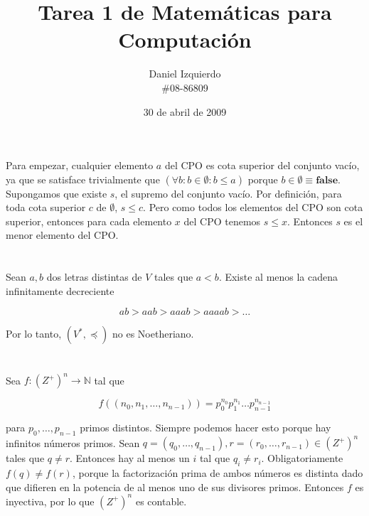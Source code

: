 \documentclass{article}
\begin{document}

\title{Tarea 1 de Matemáticas para Computación}
\author{Daniel Izquierdo \\ \#08-86809}
\date{30 de abril de 2009}

\maketitle

\section{}

Para empezar, cualquier elemento $a$ del CPO es cota superior del conjunto
vacío, ya que se satisface trivialmente que
$(\forall b : b \in \emptyset : b \leq a)$
porque $b \in \emptyset \equiv \mathbf{false}$.
Supongamos que existe $s$, el supremo del conjunto vacío. Por definición,
para toda cota superior $c$ de $\emptyset$, $s \leq c$. Pero como todos los
elementos del CPO son cota superior, entonces para cada elemento $x$ del CPO
tenemos
$s \leq x$. Entonces $s$ es el menor elemento del CPO.

\section{}

Sean $a, b$ dos letras distintas de $V$ tales que $a < b$. Existe al menos la
cadena infinitamente decreciente

$$
ab > aab > aaab > aaaab > \ldots
$$

Por lo tanto, $(V^*,\preceq)$ no es Noetheriano.

\section{}

Sea $f : (Z^+)^n \rightarrow \mathbb{N}$ tal que

$$
f((n_0,n_1,\ldots,n_{n-1})) = p_0^{n_0} p_1^{n_1} \ldots p_{n-1}^{n_{n-1}}
$$

para $p_0,\ldots,p_{n-1}$ primos distintos. Siempre podemos hacer esto porque
hay infinitos números primos. Sean
$q = (q_0,\ldots,q_{n-1}), r = (r_0,\ldots,r_{n-1}) \in (Z^+)^n$ tales que
$q \neq r$. Entonces hay al menos un $i$ tal que $q_i \neq r_i$.
Obligatoriamente $f(q) \neq f(r)$, porque la factorización prima de ambos
números es distinta dado que difieren en la potencia de al menos uno de sus
divisores primos. Entonces $f$ es inyectiva, por lo que $(Z^+)^n$ es contable.
\end{document}
